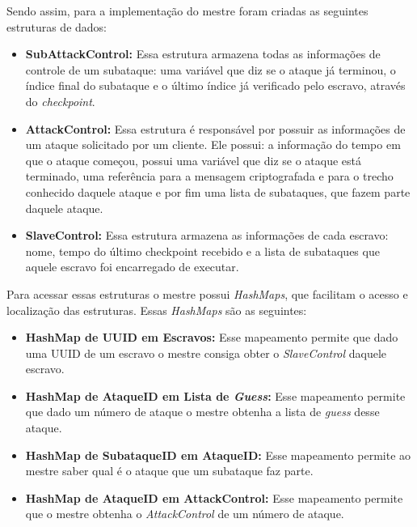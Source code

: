 \documentclass[
	12pt,				%
    oneside,			%
	a4paper,			%
	english,			%
	brazil,				%
	]{abntex2}
\begin{document}
Sendo assim, para a implementação do mestre foram criadas as seguintes estruturas de dados:

\begin{itemize}

	\item \textbf{SubAttackControl:} Essa estrutura armazena todas as informações de controle de um subataque: uma variável 
	que diz se o ataque já terminou, o índice final do subataque e o último índice já verificado pelo escravo, através do
	\textit{checkpoint}.
	
	\item \textbf{AttackControl:} Essa estrutura é responsável por possuir as informações de um ataque solicitado por um
	cliente. Ele possui: a informação do tempo em que o ataque começou, possui uma variável que diz se o ataque está 
	terminado, uma referência para a mensagem criptografada e para o trecho conhecido daquele ataque e por fim uma lista 
	de subataques, que fazem parte daquele ataque.
	
	\item \textbf{SlaveControl:} Essa estrutura armazena as informações de cada escravo: nome, tempo do último checkpoint
	recebido e a lista de subataques que aquele escravo foi encarregado de executar.
	
\end{itemize}

Para acessar essas estruturas o mestre possui \textit{HashMaps}, que facilitam o acesso e localização das estruturas. 
Essas \textit{HashMaps} são as seguintes:

\begin{itemize}

	\item \textbf{HashMap de UUID em Escravos:} Esse mapeamento permite que dado uma UUID de um escravo o mestre consiga 
	obter o \textit{SlaveControl} daquele escravo.
	
	\item \textbf{HashMap de AtaqueID em Lista de \textit{Guess}:} Esse mapeamento permite que dado um número de ataque o
	mestre obtenha a lista de \textit{guess} desse ataque.
	
	\item \textbf{HashMap de SubataqueID em AtaqueID:} Esse mapeamento permite ao mestre saber qual é o ataque que um 
	subataque faz parte.
	
	\item \textbf{HashMap de AtaqueID em AttackControl:} Esse mapeamento permite que o mestre obtenha o
	\textit{AttackControl} de um número de ataque.
	
\end{itemize}
\end{document}
